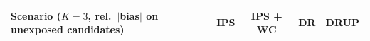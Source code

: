 \begin{tabular}{lcccc}
\toprule
Scenario ($K=3$, rel.\ $|$bias$|$ on unexposed candidates) & IPS & IPS + WC & DR & DRUP\\
\midrule
\bottomrule
\end{tabular}
